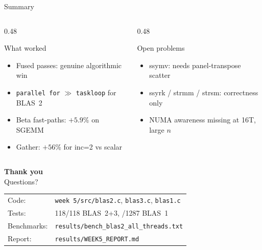 \documentclass[aspectratio=169,10pt]{beamer}
\begin{document}
\begin{frame}{Summary}
  \vspace{0.2em}
  \begin{columns}
    \begin{column}{0.48\textwidth}
      \begin{exampleblock}{What worked}
        \begin{itemize}
          \item Fused passes: genuine algorithmic win
          \item \texttt{parallel for} $\gg$ \texttt{taskloop} for BLAS~2
          \item Beta fast-paths: $+5.9\%$ on SGEMM
          \item Gather: $+56\%$ for inc=2 vs scalar
        \end{itemize}
      \end{exampleblock}
    \end{column}
    \begin{column}{0.48\textwidth}
      \begin{alertblock}{Open problems}
        \begin{itemize}
          \item ssymv: needs panel-transpose scatter
          \item ssyrk / strmm / strsm: correctness only
          \item NUMA awareness missing at 16T, large $n$
        \end{itemize}
      \end{alertblock}
    \end{column}
  \end{columns}
\end{frame}

\begin{frame}[plain]
  \begin{center}
    \vspace{2em}
    {\Large\bfseries Thank you}\\[1.5em]
    {\normalsize Questions?}\\[2em]
    \footnotesize
    \begin{tabular}{ll}
      Code:       & \texttt{week 5/src/blas2.c}, \texttt{blas3.c}, \texttt{blas1.c} \\
      Tests:      & 118/118 BLAS~2+3, \; 1287/1287 BLAS~1 \\
      Benchmarks: & \texttt{results/bench\_blas2\_all\_threads.txt} \\
      Report:     & \texttt{results/WEEK5\_REPORT.md} \\
    \end{tabular}
  \end{center}
\end{frame}
\end{document}
